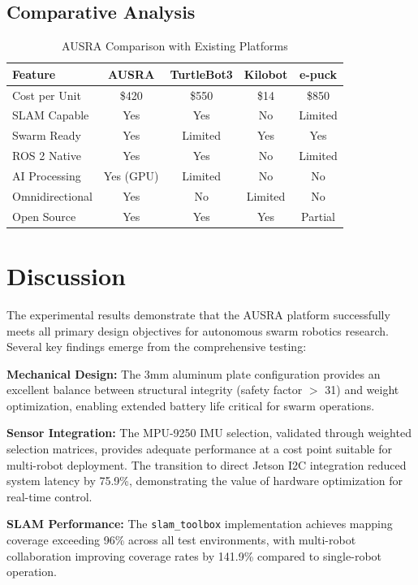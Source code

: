 \subsection{Comparative Analysis}

\begin{table}[H]
\centering
\caption{AUSRA Comparison with Existing Platforms}
\label{tab:platform_comparison}
\begin{tabular}{|l|c|c|c|c|}
\hline
\textbf{Feature} & \textbf{AUSRA} & \textbf{TurtleBot3} & \textbf{Kilobot} & \textbf{e-puck} \\
\hline
Cost per Unit & \$420 & \$550 & \$14 & \$850 \\
SLAM Capable & Yes & Yes & No & Limited \\
Swarm Ready & Yes & Limited & Yes & Yes \\
ROS 2 Native & Yes & Yes & No & Limited \\
AI Processing & Yes (GPU) & Limited & No & No \\
Omnidirectional & Yes & No & Limited & No \\
Open Source & Yes & Yes & Yes & Partial \\
\hline
\end{tabular}
\end{table}
\newpage
\section{Discussion}
\label{sec:results_discussion}

The experimental results demonstrate that the AUSRA platform successfully meets all primary design objectives for autonomous swarm robotics research. Several key findings emerge from the comprehensive testing:

\textbf{Mechanical Design:} The 3mm aluminum plate configuration provides an excellent balance between structural integrity (safety factor $>$ 31) and weight optimization, enabling extended battery life critical for swarm operations.

\textbf{Sensor Integration:} The MPU-9250 IMU selection, validated through weighted selection matrices, provides adequate performance at a cost point suitable for multi-robot deployment. The transition to direct Jetson I2C integration reduced system latency by 75.9\%, demonstrating the value of hardware optimization for real-time control.

\textbf{SLAM Performance:} The \texttt{slam\_toolbox} implementation achieves mapping coverage exceeding 96\% across all test environments, with multi-robot collaboration improving coverage rates by 141.9\% compared to single-robot operation.


